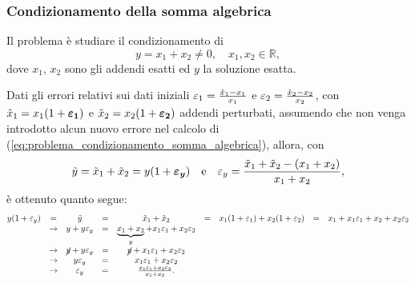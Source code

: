 \subsubsection{Condizionamento della somma algebrica}\label{ssse:condizionamento_somma_algebrica}
Il problema è studiare il condizionamento di
\begin{equation}\label{eq:problema_condizionamento_somma_algebrica}
	y=x_1+x_2\neq 0,\quad x_1,x_2\in\mathbb R,
\end{equation}
dove $x_1,\, x_2$ sono gli addendi esatti ed $y$ la soluzione esatta.

Dati gli errori relativi sui dati iniziali $\varepsilon_1=\frac{\Tilde{x}_1-x_1}{x_1}$ e $\varepsilon_2=\frac{\Tilde{x}_2-x_2}{x_2}$, con $\Tilde{x}_1=x_1(1+\boldsymbol{\varepsilon_1})$ e $\Tilde{x}_2=x_2(1+\boldsymbol{\varepsilon_2})$ addendi perturbati, assumendo che non venga introdotto alcun nuovo errore nel calcolo di (\ref{eq:problema_condizionamento_somma_algebrica}), allora, con
\begin{equation*}
	\Tilde{y}=\Tilde{x}_1+\Tilde{x}_2=y(1+\boldsymbol{\varepsilon_y})\quad\text{e}\quad\varepsilon_y=\frac{\Tilde{x}_1+\Tilde{x}_2-(x_1+x_2)}{x_1+x_2},
\end{equation*}
è ottenuto quanto segue:
\begin{equation*}
	\begin{matrix}
		y(1+\varepsilon_y)&=&\Tilde{y}&=&\Tilde{x}_1+\Tilde{x}_2&=&x_1(1+\varepsilon_1)+x_2(1+\varepsilon_2)&=&x_1+x_1\varepsilon_1+x_2+x_2\varepsilon_2\\
		&\rightarrow& y+y\varepsilon_y&=&\underbrace{x_1+x_2}_{y}+x_1\varepsilon_1+x_2\varepsilon_2\\
		&\rightarrow& \cancel{y}+y\varepsilon_y &=& \cancel{y}+x_1\varepsilon_1+x_2\varepsilon_2\\
		&\rightarrow& y\varepsilon_y &=& x_1\varepsilon_1+x_2\varepsilon_2 \\
		&\rightarrow& \varepsilon_y &=& \frac{x_1\varepsilon_1+x_2\varepsilon_2}{x_1+x_2}.
	\end{matrix}
\end{equation*}

